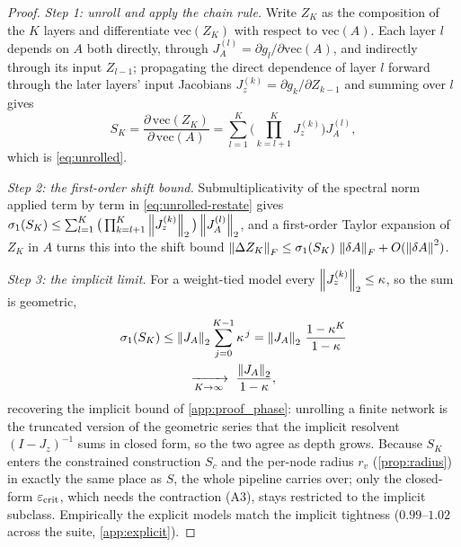 \begin{proof}
\emph{Step 1: unroll and apply the chain rule.}
Write $Z_K$ as the composition of the $K$ layers and differentiate $\mathrm{vec}(Z_K)$ with respect to
$\mathrm{vec}(A)$. Each layer $l$ depends on $A$ both directly, through
$J_A^{(l)}=\partial g_l/\partial\mathrm{vec}(A)$, and indirectly through its input $Z_{l-1}$; propagating
the direct dependence of layer $l$ forward through the later layers' input Jacobians
$J_z^{(k)}=\partial g_k/\partial Z_{k-1}$ and summing over $l$ gives
\begin{equation}
S_K=\frac{\partial\,\mathrm{vec}(Z_K)}{\partial\,\mathrm{vec}(A)}
=\sum_{l=1}^{K}\Big(\prod_{k=l+1}^{K}J_z^{(k)}\Big)J_A^{(l)},
\label{eq:unrolled-restate}
\end{equation}
which is \eqref{eq:unrolled}.

\emph{Step 2: the first-order shift bound.}
Submultiplicativity of the spectral norm applied term by term in \eqref{eq:unrolled-restate} gives
$\sigma_1(S_K)\le\sum_{l=1}^{K}\big(\prod_{k=l+1}^{K}\left\|J_z^{(k)}\right\|_2\big)\left\|J_A^{(l)}\right\|_2$, and a
first-order Taylor expansion of $Z_K$ in $A$ turns this into the shift bound
$\left\|\Delta Z_K\right\|_F\le\sigma_1(S_K)\,\left\|\delta A\right\|_F+O(\left\|\delta A\right\|^2)$.

\emph{Step 3: the implicit limit.}
For a weight-tied model every $\left\|J_z^{(k)}\right\|_2\le\kappa$, so the sum is geometric,
\begin{multline}
\sigma_1(S_K)\le\left\|J_A\right\|_2\sum_{j=0}^{K-1}\kappa^{\,j}=\left\|J_A\right\|_2\,\frac{1-\kappa^{K}}{1-\kappa}\\
\xrightarrow[K\to\infty]{}\ \frac{\left\|J_A\right\|_2}{1-\kappa},
\label{eq:explicit-limit}
\end{multline}
recovering the implicit bound of \cref{app:proof_phase}: unrolling a finite network is the truncated
version of the geometric series that the implicit resolvent $(I-J_z)^{-1}$ sums in closed form, so the
two agree as depth grows. Because $S_K$ enters the constrained construction $S_c$ and the per-node
radius $r_v$ (\cref{prop:radius}) in exactly the same place as $S$, the whole pipeline carries over;
only the closed-form $\varepsilon_{\mathrm{crit}}$, which needs the contraction (A3), stays restricted to the implicit
subclass. Empirically the explicit models match the implicit tightness ($0.99$--$1.02$ across the
suite, \cref{app:explicit}).
\end{proof}
